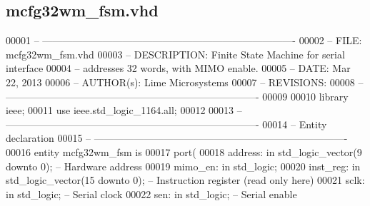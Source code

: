 \subsection{mcfg32wm\+\_\+fsm.\+vhd}
\label{mcfg32wm__fsm_8vhd_source}

\begin{DoxyCode}
00001 \textcolor{keyword}{-- ---------------------------------------------------------------------------- }
00002 \textcolor{keyword}{-- FILE:    mcfg32wm\_fsm.vhd}
00003 \textcolor{keyword}{-- DESCRIPTION: Finite State Machine for serial interface}
00004 \textcolor{keyword}{--                          addresses 32 words, with MIMO enable.}
00005 \textcolor{keyword}{-- DATE:    Mar 22, 2013}
00006 \textcolor{keyword}{-- AUTHOR(s):   Lime Microsystems}
00007 \textcolor{keyword}{-- REVISIONS:}
00008 \textcolor{keyword}{-- ---------------------------------------------------------------------------- }
00009 
00010 \textcolor{vhdlkeyword}{library }\textcolor{keywordflow}{ieee};
00011 \textcolor{vhdlkeyword}{use }ieee.std\_logic\_1164.\textcolor{keywordflow}{all};
00012 
00013 \textcolor{keyword}{-- ----------------------------------------------------------------------------}
00014 \textcolor{keyword}{-- Entity declaration}
00015 \textcolor{keyword}{-- ----------------------------------------------------------------------------}
00016 \textcolor{keywordflow}{entity }mcfg32wm_fsm \textcolor{keywordflow}{is}
00017     \textcolor{keywordflow}{port}\textcolor{vhdlchar}{(}
00018         \textcolor{vhdlchar}{address}\textcolor{vhdlchar}{:} \textcolor{keywordflow}{in} \textcolor{comment}{std\_logic\_vector}\textcolor{vhdlchar}{(}\textcolor{vhdllogic}{}\textcolor{vhdllogic}{9} \textcolor{keywordflow}{downto} \textcolor{vhdllogic}{}\textcolor{vhdllogic}{0}\textcolor{vhdlchar}{)};\textcolor{keyword}{   -- Hardware address}
00019         \textcolor{vhdlchar}{mimo_en}\textcolor{vhdlchar}{:} \textcolor{keywordflow}{in} \textcolor{comment}{std\_logic};
00020         inst\_reg: \textcolor{keywordflow}{in} \textcolor{comment}{std\_logic\_vector}(\textcolor{vhdllogic}{15} \textcolor{keywordflow}{downto} \textcolor{vhdllogic}{0}); -- Instruction \textcolor{keywordflow}{register} (read only here)
00021         \textcolor{vhdlchar}{sclk}\textcolor{vhdlchar}{:} \textcolor{keywordflow}{in} \textcolor{comment}{std\_logic};\textcolor{keyword}{             -- Serial clock}
00022         \textcolor{vhdlchar}{sen}\textcolor{vhdlchar}{:} \textcolor{keywordflow}{in} \textcolor{comment}{std\_logic};\textcolor{keyword}{              -- Serial enable}

\end{DoxyCode}
